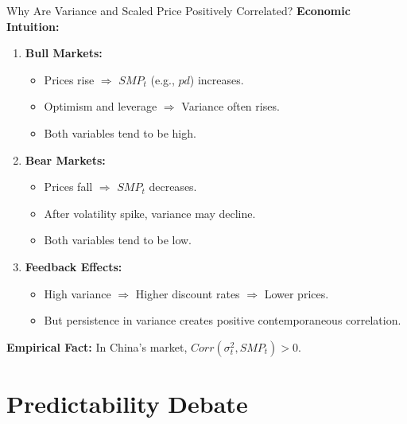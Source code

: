\documentclass{beamer}
\begin{document}
\begin{frame}{Why Are Variance and Scaled Price Positively Correlated?}
    \textbf{Economic Intuition:}
    
    \begin{enumerate}
        \item \textbf{Bull Markets:}
            \begin{itemize}
                \item Prices rise $\Rightarrow$ $SMP_t$ (e.g., $pd$) increases.
                \item Optimism and leverage $\Rightarrow$ Variance often rises.
                \item Both variables tend to be high.
            \end{itemize}
        
        \item \textbf{Bear Markets:}
            \begin{itemize}
                \item Prices fall $\Rightarrow$ $SMP_t$ decreases.
                \item After volatility spike, variance may decline.
                \item Both variables tend to be low.
            \end{itemize}
        
        \item \textbf{Feedback Effects:}
            \begin{itemize}
                \item High variance $\Rightarrow$ Higher discount rates $\Rightarrow$ Lower prices.
                \item But persistence in variance creates positive contemporaneous correlation.
            \end{itemize}
    \end{enumerate}
    
    \vspace{0.2cm}
    \textbf{Empirical Fact:} In China's market, $Corr(\sigma_t^2, SMP_t) > 0$.
\end{frame}

\section{Predictability Debate}
\end{document}
